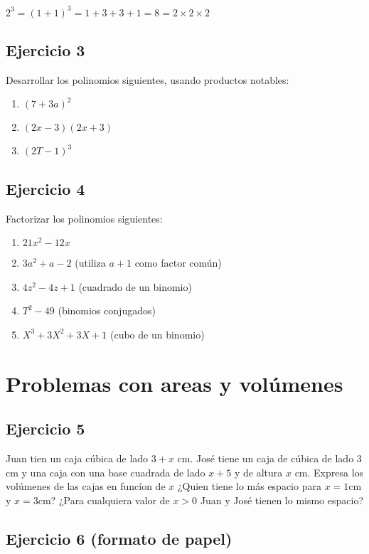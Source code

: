 $2^3 = {(1+1)}^3 = 1 + 3 + 3 + 1 = 8 = 2 \times 2 \times 2$

\subsection*{Ejercicio 3}

Desarrollar los polinomios siguientes, usando productos notables:

\begin{enumerate}
\item $(7+3a)^2$
\item $(2x-3)(2x+3)$
\item $(2T-1)^3$
\end{enumerate}

\subsection*{Ejercicio 4}

Factorizar los polinomios siguientes:

\begin{enumerate}
\item $21x^2 - 12x$
\item $3a^2 + a-2$ (utiliza $a+1$ como factor común)
\item $4z^2 - 4z + 1$ (cuadrado de un binomio)
\item $T^2 - 49$ (binomios conjugados)
\item $X^3 + 3X^2 + 3X + 1$ (cubo de un binomio)
\end{enumerate}

\section{Problemas con areas y volúmenes}

\subsection*{Ejercicio 5}

Juan tien un caja cúbica de lado $3+x$ cm.
José tiene un caja de cúbica de lado $3$ cm y una caja con una base cuadrada de
lado $x+5$ y de altura $x$ cm. Expresa los volúmenes de las cajas en funcíon de
$x$ ¿Quien tiene lo más espacio para $x=1$cm y $x = 3$cm? ¿Para cualquiera
valor de $x > 0$ Juan y José tienen lo mismo espacio?

\subsection*{Ejercicio 6 (formato de papel)}

